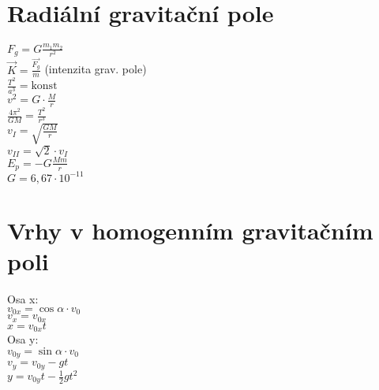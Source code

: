 \documentclass{article}
\begin{document}
\section{Radiální gravitační pole}
\begin{multicols}{2}
\noindent $F_g=G\frac{m_1m_2}{r^2}$\\
$\vec{K}=\frac{\vec{F_g}}{m}$ (intenzita grav. pole)\\
$\frac{T^2}{a^3} = \text{konst}$\\
$v^2=G\cdot \frac{M}{r}$\\
$\frac{4\pi ^2}{GM}=\frac{T^2}{r^3}$\\
$v_I = \sqrt{\frac{GM}{r}}$\\
$v_{II} = \sqrt{2}\cdot v_I$\\
$E_p = -G\frac{Mm}{r}$\\
$G=6,67\cdot 10^{-11}$\\
\end{multicols}

\section{Vrhy v homogenním gravitačním poli}
\begin{multicols}{2}
\noindent Osa x:\\
$v_{0x}=\cos{\alpha}\cdot v_0$\\
$v_x=v_{0x}$\\
$x=v_{0x}t$\\
Osa y:\\
$v_{0y}=\sin{\alpha}\cdot v_0$\\
$v_y=v_{0y}-gt$\\
$y=v_{0y}t-\frac{1}{2}gt^2$
\end{multicols}
\end{document}
